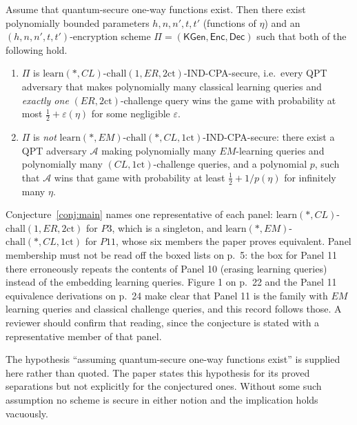 \documentclass{conjura-conjecture}
\newcommand{\KGen}{\mathsf{KGen}}
\newcommand{\Enc}{\mathsf{Enc}}
\newcommand{\Dec}{\mathsf{Dec}}
\newcommand{\onect}{1\mathrm{ct}}
\newcommand{\twoct}{2\mathrm{ct}}
\newcommand{\learn}{\mathrm{learn}}
\newcommand{\chall}{\mathrm{chall}}
\newcommand{\NErOne}{\ensuremath{\learn(*,CL)}-\ensuremath{\chall(1,ER,\twoct)}}
\newcommand{\NEmMany}{\ensuremath{\learn(*,EM)}-\ensuremath{\chall(*,CL,\onect)}}
\begin{document}
\begin{conjecture}\label{conj:main}
Assume that quantum-secure one-way functions exist. Then there exist
polynomially bounded parameters $h,n,n',t,t'$ (functions of $\eta$) and
an $(h,n,n',t,t')$-encryption scheme $\Pi=(\KGen,\Enc,\Dec)$ such that
both of the following hold.
\begin{enumerate}
  \item $\Pi$ is \NErOne-IND-CPA-secure, i.e.\ every QPT adversary that
    makes polynomially many classical learning queries and \emph{exactly
    one} $(ER,\twoct)$-challenge query wins the game with probability at
    most $\tfrac12+\varepsilon(\eta)$ for some negligible $\varepsilon$.
  \item $\Pi$ is \emph{not} \NEmMany-IND-CPA-secure: there exist a QPT
    adversary $\mathcal{A}$ making polynomially many $EM$-learning
    queries and polynomially many $(CL,\onect)$-challenge queries, and a
    polynomial $p$, such that $\mathcal{A}$ wins that game with
    probability at least $\tfrac12+1/p(\eta)$ for infinitely many
    $\eta$.
\end{enumerate}
\end{conjecture}

\begin{remark}\label{rem:panels}
Conjecture~\ref{conj:main} names one representative of each panel:
\NErOne{} for $P3$, which is a singleton, and \NEmMany{} for $P11$,
whose six members the paper proves equivalent. Panel membership must not
be read off the boxed lists on p.~5: the box for Panel 11 there
erroneously repeats the contents of Panel 10 (erasing learning queries)
instead of the embedding learning queries. Figure 1 on p.~22 and the
Panel 11 equivalence derivations on p.~24 make clear that Panel 11 is
the family with $EM$ learning queries and classical challenge queries,
and this record follows those. A reviewer should confirm that reading,
since the conjecture is stated with a representative member of that
panel.
\end{remark}

\begin{remark}\label{rem:owf}
The hypothesis ``assuming quantum-secure one-way functions exist'' is
supplied here rather than quoted. The paper states this hypothesis for
its proved separations but not explicitly for the conjectured ones.
Without some such assumption no scheme is secure in either notion and
the implication holds vacuously.
\end{remark}
\end{document}

